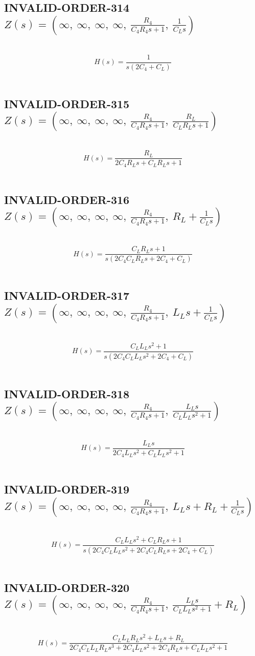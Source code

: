 \documentclass{article}
\begin{document}
\subsection{INVALID-ORDER-314 $Z(s) = \left( \infty, \  \infty, \  \infty, \  \infty, \  \frac{R_{4}}{C_{4} R_{4} s + 1}, \  \frac{1}{C_{L} s}\right)$ } \ 
\textbf{\[H(s) = \frac{1}{s \left(2 C_{4} + C_{L}\right)}\] } \ 
\subsection{INVALID-ORDER-315 $Z(s) = \left( \infty, \  \infty, \  \infty, \  \infty, \  \frac{R_{4}}{C_{4} R_{4} s + 1}, \  \frac{R_{L}}{C_{L} R_{L} s + 1}\right)$ } \ 
\textbf{\[H(s) = \frac{R_{L}}{2 C_{4} R_{L} s + C_{L} R_{L} s + 1}\] } \ 
\subsection{INVALID-ORDER-316 $Z(s) = \left( \infty, \  \infty, \  \infty, \  \infty, \  \frac{R_{4}}{C_{4} R_{4} s + 1}, \  R_{L} + \frac{1}{C_{L} s}\right)$ } \ 
\textbf{\[H(s) = \frac{C_{L} R_{L} s + 1}{s \left(2 C_{4} C_{L} R_{L} s + 2 C_{4} + C_{L}\right)}\] } \ 
\subsection{INVALID-ORDER-317 $Z(s) = \left( \infty, \  \infty, \  \infty, \  \infty, \  \frac{R_{4}}{C_{4} R_{4} s + 1}, \  L_{L} s + \frac{1}{C_{L} s}\right)$ } \ 
\textbf{\[H(s) = \frac{C_{L} L_{L} s^{2} + 1}{s \left(2 C_{4} C_{L} L_{L} s^{2} + 2 C_{4} + C_{L}\right)}\] } \ 
\subsection{INVALID-ORDER-318 $Z(s) = \left( \infty, \  \infty, \  \infty, \  \infty, \  \frac{R_{4}}{C_{4} R_{4} s + 1}, \  \frac{L_{L} s}{C_{L} L_{L} s^{2} + 1}\right)$ } \ 
\textbf{\[H(s) = \frac{L_{L} s}{2 C_{4} L_{L} s^{2} + C_{L} L_{L} s^{2} + 1}\] } \ 
\subsection{INVALID-ORDER-319 $Z(s) = \left( \infty, \  \infty, \  \infty, \  \infty, \  \frac{R_{4}}{C_{4} R_{4} s + 1}, \  L_{L} s + R_{L} + \frac{1}{C_{L} s}\right)$ } \ 
\textbf{\[H(s) = \frac{C_{L} L_{L} s^{2} + C_{L} R_{L} s + 1}{s \left(2 C_{4} C_{L} L_{L} s^{2} + 2 C_{4} C_{L} R_{L} s + 2 C_{4} + C_{L}\right)}\] } \ 
\subsection{INVALID-ORDER-320 $Z(s) = \left( \infty, \  \infty, \  \infty, \  \infty, \  \frac{R_{4}}{C_{4} R_{4} s + 1}, \  \frac{L_{L} s}{C_{L} L_{L} s^{2} + 1} + R_{L}\right)$ } \ 
\textbf{\[H(s) = \frac{C_{L} L_{L} R_{L} s^{2} + L_{L} s + R_{L}}{2 C_{4} C_{L} L_{L} R_{L} s^{3} + 2 C_{4} L_{L} s^{2} + 2 C_{4} R_{L} s + C_{L} L_{L} s^{2} + 1}\] } \ 
\end{document}
